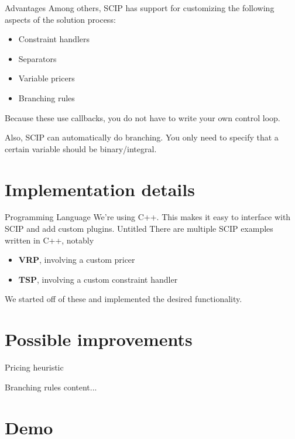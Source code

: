 \documentclass[fleqn]{beamer}
\begin{document}
    \begin{frame}{Advantages}
        Among others, SCIP has support for customizing the following aspects of the solution process:
        \begin{itemize}
            \item Constraint handlers %
            \item Separators
            \item Variable pricers
            \item Branching rules
        \end{itemize}
        Because these use callbacks, you do not have to write your own control loop.
        
        Also, SCIP can automatically do branching.
        You only need to specify that a certain variable should be binary/integral.
    \end{frame}
	
	\section{Implementation details}
    \begin{frame}{Programming Language}
        We're using C++.
        This makes it easy to interface with SCIP and add custom plugins.
        Untitled
        There are multiple SCIP examples written in C++, notably
        \begin{itemize}
            \item \textbf{VRP}, involving a custom pricer %
            \item \textbf{TSP}, involving a custom constraint handler %
        \end{itemize}
        We started off of these and implemented the desired functionality.
    \end{frame}
    
	\section{Possible improvements}
    \begin{frame}{Pricing heuristic}
        
    \end{frame}

    \begin{frame}{Branching rules}
        content...
    \end{frame}
    
    \section{Demo}
\end{document}
